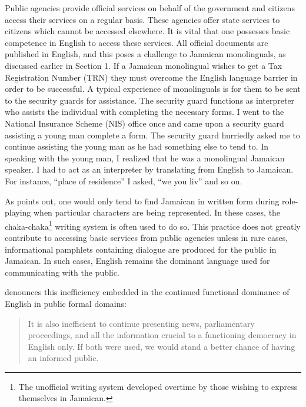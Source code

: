 \documentclass[output=paper,colorlinks,citecolor=brown]{langscibook}
\begin{document}
Public agencies provide official services on behalf of the government and citizens access their services on a regular basis. These agencies offer state services to citizens which cannot be accessed elsewhere. It is vital that one possesses basic competence in English to access these services. All official documents are published in English, and this poses a challenge to Jamaican monolinguals, as discussed earlier in Section 1. If a Jamaican monolingual wishes to get a Tax Registration Number (TRN) they must overcome the English language barrier in order to be successful. A typical experience of monolinguals is for them to be sent to the security guards for assistance. The security guard functions as interpreter who assists the individual with completing the necessary forms. I went to the National Insurance Scheme (NIS) office once and came upon a security guard assisting a young man complete a form. The security guard hurriedly asked me to continue assisting the young man as he had something else to tend to. In speaking with the young man, I realized that he was a monolingual Jamaican speaker. I had to act as an interpreter by translating from English to Jamaican. For instance, “place of residence” I asked, “we you liv” and so on. 

As \citet{Devonish2001} points out, one would only tend to find Jamaican in written form during role-playing when particular characters are being represented. In these cases, the chaka-chaka\footnote{The unofficial writing system developed overtime by those wishing to express themselves in Jamaican.} writing system is often used to do so. This practice does not greatly contribute to accessing basic services from public agencies unless in rare cases, informational pamphlets containing dialogue are produced for the public in Jamaican. In such cases, English remains the dominant language used for communicating with the public.

\citet{Irvine2004} denounces this inefficiency embedded in the continued functional dominance of English in public formal domains:

\begin{quote}
    It is also inefficient to continue presenting news, parliamentary proceedings, and all the information crucial to a functioning democracy in English only. If both were used, we would stand a better chance of having an informed public.
\end{quote}
\end{document}
